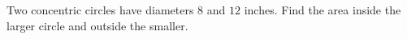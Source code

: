Two concentric circles have diameters $8$ and $12$ inches. Find the area inside the larger circle and outside the smaller.
